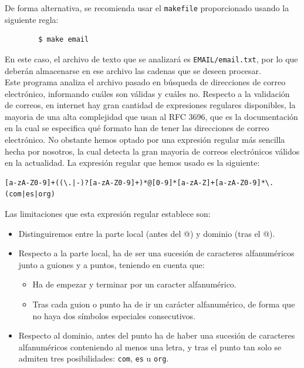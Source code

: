 \documentclass[12pt]{article}
\begin{document}
    De forma alternativa, se recomienda usar el \verb|makefile| proporcionado usando la siguiente regla:
    \begin{verbatim}
        $ make email
    \end{verbatim}

    En este caso, el archivo de texto que se analizará es \verb|EMAIL/email.txt|, por lo que deberán almacenarse en ese archivo las cadenas que se deseen procesar.\\

    Este programa analiza el archivo pasado en búsqueda de direcciones de correo electrónico, informando cuáles son válidas y cuáles no. Respecto a la validación de correos, en internet hay gran cantidad de expresiones regulares disponibles, la mayoria de una alta complejidad que usan al RFC 3696, que es la documentación en la cual se especifica qué formato han de tener las direcciones de correo electrónico. No obstante hemos optado por una expresión regular más sencilla hecha por nosotros, la cual detecta la gran mayoria de correos electrónicos válidos en la actualidad. La expresión regular que hemos usado es la siguiente:
    \begin{lstlisting}
[a-zA-Z0-9]+((\.|-)?[a-zA-Z0-9]+)*@[0-9]*[a-zA-Z]+[a-zA-Z0-9]*\.(com|es|org)
    \end{lstlisting}

    Las limitaciones que esta expresión regular establece son:
    \begin{itemize}
        \item Distinguiremos entre la parte local (antes del @) y dominio (tras el @).
        \item Respecto a la parte local, ha de ser una sucesión de caracteres alfanuméricos junto a guiones y a puntos, teniendo en cuenta que:
        \begin{itemize}
            \item Ha de empezar y terminar por un caracter alfanumérico.
            \item Tras cada guion o punto ha de ir un carácter alfanumérico, de forma que no haya dos símbolos especiales consecutivos.
        \end{itemize}
        \item Respecto al dominio, antes del punto ha de haber una sucesión de caracteres alfanuméricos conteniendo al menos una letra, y tras el punto tan solo se admiten tres posibilidades: \verb|com|, \verb|es| u \verb|org|.
    \end{itemize}
\end{document}
